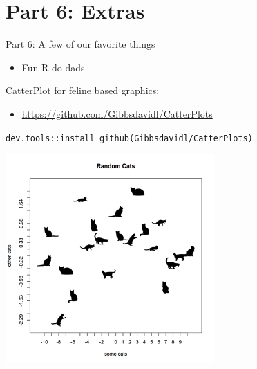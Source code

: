 \documentclass[ignorenonframetext,]{beamer}
\providecommand{\tightlist}{%
  \setlength{\itemsep}{0pt}\setlength{\parskip}{0pt}}
\begin{document}
\hypertarget{part-6-extras}{%
\section{Part 6: Extras}\label{part-6-extras}}

\begin{frame}{Part 6: A few of our favorite things}
\protect\hypertarget{part-6-a-few-of-our-favorite-things}{}

\begin{itemize}
\tightlist
\item
  Fun R do-dads
\end{itemize}

\end{frame}

\begin{frame}[fragile]{CatterPlot for feline based graphics:}
\protect\hypertarget{catterplot-for-feline-based-graphics}{}

\begin{itemize}
\tightlist
\item
  \url{https://github.com/Gibbsdavidl/CatterPlots}
\end{itemize}

\texttt{dev.tools::install\_github(Gibbsdavidl/CatterPlots)}

\includegraphics[width=0.6\textwidth,height=\textheight]{../external/images/funR_1_catterplotter.png}

\end{frame}
\end{document}
